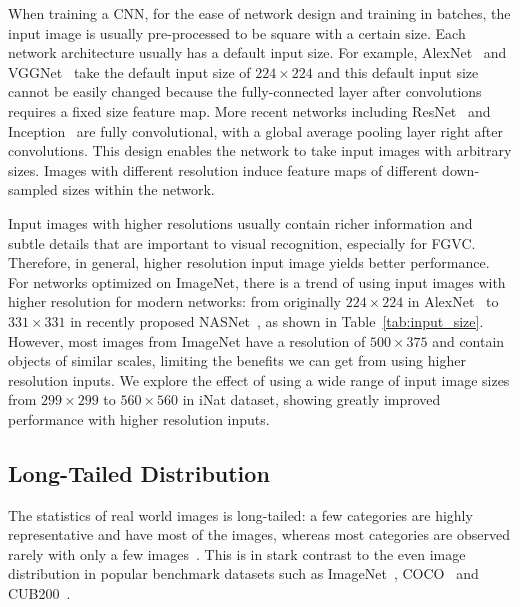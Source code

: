 \documentclass[10pt,twocolumn,letterpaper]{article}
\begin{document}
When training a CNN, for the ease of network design and training in batches, the input image is usually pre-processed to be square with a certain size.
Each network architecture usually has a default input size.
For example, AlexNet~\cite{alexnet} and VGGNet~\cite{vggnet} take the default input size of $224 \times 224$ and this default input size cannot be easily changed because the fully-connected layer after convolutions requires a fixed size feature map.
More recent networks including ResNet~\cite{resnet} and Inception~\cite{googlenet, inception-v3, inception-v4} are fully convolutional, with a global average pooling layer right after convolutions.
This design enables the network to take input images with arbitrary sizes.
Images with different resolution induce feature maps of different down-sampled sizes within the network.

Input images with higher resolutions usually contain richer information and subtle details that are important to visual recognition, especially for FGVC.
Therefore, in general, higher resolution input image yields better performance.
For networks optimized on ImageNet, there is a trend of using input images with higher resolution for modern networks: from originally $224 \times 224$ in AlexNet~\cite{alexnet} to $331 \times 331$ in recently proposed NASNet~\cite{nasnet}, as shown in Table\ \ref{tab:input_size}.
However, most images from ImageNet have a resolution of $500 \times 375$ and contain objects of similar scales, limiting the benefits we can get from using higher resolution inputs.
We explore the effect of using a wide range of input image sizes from $299 \times 299$ to $560 \times 560$ in iNat dataset, showing greatly improved performance with higher resolution inputs.



\subsection{Long-Tailed Distribution}
\label{sec:long-tailed}

The statistics of real world images is long-tailed: a few categories are highly representative and have most of the images, whereas most categories are observed rarely with only a few images~\cite{long-tail_object, van2017devil}.
This is in stark contrast to the even image distribution in popular benchmark datasets such as ImageNet~\cite{imagenet}, COCO~\cite{coco} and CUB200~\cite{cub200}.
\end{document}
